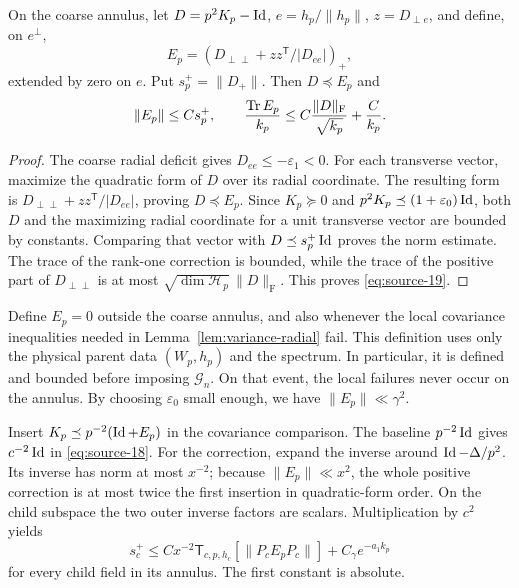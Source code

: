 \begin{lemma}\label{lem:variance-radial}
On the coarse annulus, let $D=p^2K_p-\operatorname{Id}$, $e=h_p/\|h_p\|$,
$z=D_{\perp e}$, and define, on $e^\perp$,
\[
 E_p=(D_{\perp\perp}+zz^{\mathsf T}/|D_{ee}|)_+,
\]
extended by zero on $e$. Put $s_p^+=\|D_+\|$. Then
$D\preceq E_p$ and
\begin{equation}\label{eq:source-19}
 \|E_p\|\le Cs_p^+,
 \qquad
 \frac{\operatorname{Tr} E_p}{k_p}
 \le C\frac{\|D\|_{\mathrm F}}{\sqrt{k_p}}+\frac C{k_p}.
\end{equation}
\end{lemma}

\begin{proof}
The coarse radial deficit gives $D_{ee}\le-\varepsilon_1<0$.
For each transverse vector, maximize the quadratic form of $D$ over its
radial coordinate. The resulting form is
$D_{\perp\perp}+zz^{\mathsf T}/|D_{ee}|$, proving $D\preceq E_p$.
Since $K_p\succeq0$ and $p^2K_p\preceq(1+\varepsilon_0)\operatorname{Id}$, both
$D$ and the maximizing radial coordinate for a unit transverse vector
are bounded by constants. Comparing that vector with
$D\preceq s_p^+\operatorname{Id}$ proves the norm estimate. The trace of the rank-one
correction is bounded, while the trace of the positive part of
$D_{\perp\perp}$ is at most
$\sqrt{\dim\mathcal H_p}\,\|D\|_{\mathrm F}$. This proves
\eqref{eq:source-19}.
\end{proof}

Define $E_p=0$ outside the coarse annulus, and also whenever the local
covariance inequalities needed in Lemma~\ref{lem:variance-radial} fail.
This definition uses only the physical parent data $(W_p,h_p)$ and the
spectrum. In particular, it is defined and bounded before imposing
$\mathcal G_n$. On that event, the local failures never occur on the
annulus. By choosing $\varepsilon_0$ small enough, we have
$\|E_p\|\ll\gamma^2$.

Insert $K_p\preceq p^{-2}(\operatorname{Id}+E_p)$ in the covariance comparison.
The baseline $p^{-2}\operatorname{Id}$ gives $c^{-2}\operatorname{Id}$ in
\eqref{eq:source-18}. For the correction, expand the inverse around
$\operatorname{Id}-\Delta/p^2$. Its inverse has norm at most $x^{-2}$; because
$\|E_p\|\ll x^2$, the whole positive correction is at most twice the
first insertion in quadratic-form order. On the child subspace the two
outer inverse factors are scalars. Multiplication by $c^2$ yields
\begin{equation}\label{eq:source-20}
 s_c^+\le Cx^{-2}\mathsf T_{c,p,h_c}
                    [\|P_cE_pP_c\|]+C_\gamma e^{-a_1k_p}
\end{equation}
for every child field in its annulus. The first constant is absolute.

